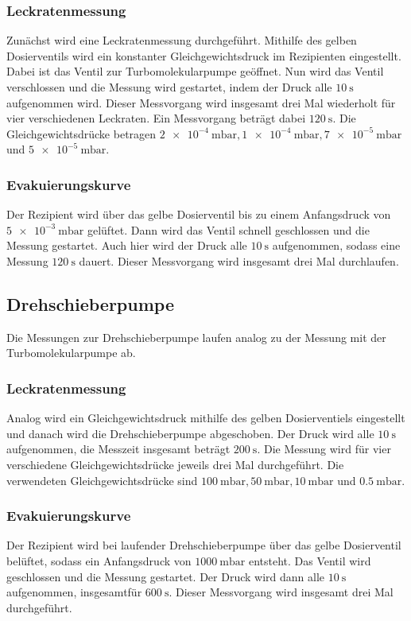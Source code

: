             \subsubsection{Leckratenmessung}
                Zunächst wird eine Leckratenmessung durchgeführt.
                Mithilfe des gelben Dosierventils wird ein konstanter Gleichgewichtsdruck im Rezipienten eingestellt.
                Dabei ist das Ventil zur Turbomolekularpumpe geöffnet.
                Nun wird das Ventil verschlossen und die Messung wird gestartet, indem der Druck alle $\SI{10}{\second}$ aufgenommen wird.
                Dieser Messvorgang wird insgesamt drei Mal wiederholt für vier verschiedenen Leckraten.
                Ein Messvorgang beträgt dabei $\SI{120}{\second}$.
                Die Gleichgewichtsdrücke betragen $\SI{2e-4}{\milli\bar}, \SI{1e-4}{\milli\bar}, \SI{7e-5}{\milli\bar}$ und $\SI{5e-5}{\milli\bar}$.

            \subsubsection{Evakuierungskurve}
                Der Rezipient wird über das gelbe Dosierventil bis zu einem Anfangsdruck von $\SI{5e-3}{\milli\bar}$ gelüftet.
                Dann wird das Ventil schnell geschlossen und die Messung gestartet.
                Auch hier wird der Druck alle $\SI{10}{\second}$ aufgenommen, sodass eine Messung $\SI{120}{\second}$ dauert.
                Dieser Messvorgang wird insgesamt drei Mal durchlaufen.

        \subsection{Drehschieberpumpe}
            Die Messungen zur Drehschieberpumpe laufen analog zu der Messung mit der Turbomolekularpumpe ab.
            \subsubsection{Leckratenmessung}
                Analog wird ein Gleichgewichtsdruck mithilfe des gelben Dosierventiels eingestellt und danach wird die Drehschieberpumpe abgeschoben.
                Der Druck wird alle $\SI{10}{\second}$ aufgenommen, die Messzeit insgesamt beträgt $\SI{200}{\second}$.
                Die Messung wird für vier verschiedene Gleichgewichtsdrücke jeweils drei Mal durchgeführt.
                Die verwendeten Gleichgewichtsdrücke sind $\SI{100}{\milli\bar}, \SI{50}{\milli\bar}, \SI{10}{\milli\bar}$ und $\SI{0.5}{\milli\bar}$.
            \subsubsection{Evakuierungskurve}
                Der Rezipient wird bei laufender Drehschieberpumpe über das gelbe Dosierventil belüftet, sodass ein Anfangsdruck von $\SI{1000}{\milli\bar}$ entsteht.
                Das Ventil wird geschlossen und die Messung gestartet.
                Der Druck wird dann alle $\SI{10}{\second}$ aufgenommen, insgesamtfür $\SI{600}{\second}$.
                Dieser Messvorgang wird insgesamt drei Mal durchgeführt.